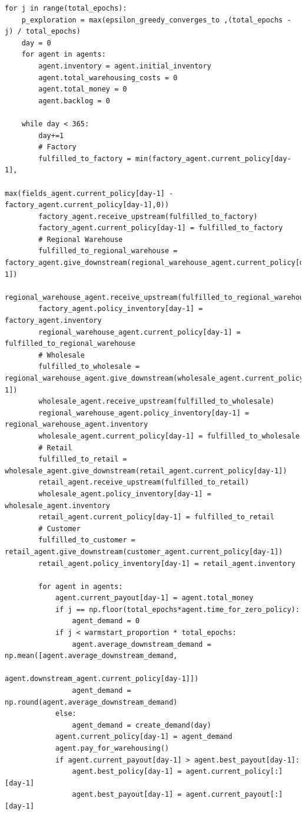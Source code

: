 \begin{verbatim}
for j in range(total_epochs):
    p_exploration = max(epsilon_greedy_converges_to ,(total_epochs - j) / total_epochs)
    day = 0
    for agent in agents:
        agent.inventory = agent.initial_inventory
        agent.total_warehousing_costs = 0
        agent.total_money = 0
        agent.backlog = 0

    while day < 365:  
        day+=1
        # Factory
        fulfilled_to_factory = min(factory_agent.current_policy[day-1],
                                   max(fields_agent.current_policy[day-1] - factory_agent.current_policy[day-1],0))
        factory_agent.receive_upstream(fulfilled_to_factory)
        factory_agent.current_policy[day-1] = fulfilled_to_factory
        # Regional Warehouse
        fulfilled_to_regional_warehouse = factory_agent.give_downstream(regional_warehouse_agent.current_policy[day-1])
        regional_warehouse_agent.receive_upstream(fulfilled_to_regional_warehouse)
        factory_agent.policy_inventory[day-1] = factory_agent.inventory
        regional_warehouse_agent.current_policy[day-1] = fulfilled_to_regional_warehouse
        # Wholesale
        fulfilled_to_wholesale = regional_warehouse_agent.give_downstream(wholesale_agent.current_policy[day-1])
        wholesale_agent.receive_upstream(fulfilled_to_wholesale)
        regional_warehouse_agent.policy_inventory[day-1] = regional_warehouse_agent.inventory
        wholesale_agent.current_policy[day-1] = fulfilled_to_wholesale
        # Retail
        fulfilled_to_retail = wholesale_agent.give_downstream(retail_agent.current_policy[day-1])
        retail_agent.receive_upstream(fulfilled_to_retail)
        wholesale_agent.policy_inventory[day-1] = wholesale_agent.inventory
        retail_agent.current_policy[day-1] = fulfilled_to_retail
        # Customer
        fulfilled_to_customer = retail_agent.give_downstream(customer_agent.current_policy[day-1])
        retail_agent.policy_inventory[day-1] = retail_agent.inventory

        for agent in agents:
            agent.current_payout[day-1] = agent.total_money
            if j == np.floor(total_epochs*agent.time_for_zero_policy):
                agent_demand = 0
            if j < warmstart_proportion * total_epochs:
                agent.average_downstream_demand = np.mean([agent.average_downstream_demand,
                                                           agent.downstream_agent.current_policy[day-1]])
                agent_demand = np.round(agent.average_downstream_demand)  
            else:
                agent_demand = create_demand(day)
            agent.current_policy[day-1] = agent_demand
            agent.pay_for_warehousing()
            if agent.current_payout[day-1] > agent.best_payout[day-1]:  
                agent.best_policy[day-1] = agent.current_policy[:][day-1]  
                agent.best_payout[day-1] = agent.current_payout[:][day-1]
                
\end{verbatim}

